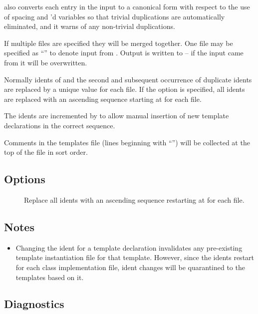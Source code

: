  also converts each entry in the input to a canonical form with
respect to the use of spacing and 'd variables so that trivial
duplications are automatically eliminated, and it warns of any non-trivial
duplications.

If multiple files are specified they will be merged together.  One file may
be specified as ``\file{-}'' to denote input from .  Output is
written to  -- if the input came from  it will
be overwritten.

Normally idents of  and the second and subsequent occurrence of
duplicate idents are replaced by a unique value for each  file.  If
the  option is specified, all idents are replaced with an ascending
sequence starting at  for each  file.

The idents are incremented by  to allow manual insertion of new
template declarations in the correct sequence.

Comments in the templates file (lines beginning with ``\code{\#}'') will be
collected at the top of the file in sort order.

\subsection*{Options}

\begin{description}
\item[]
   Replace all idents with an ascending sequence restarting at  for
   each  file.
\end{description}

\subsection*{Notes}

\begin{itemize}
\item
    Changing the ident for a template declaration invalidates any pre-existing
    template instantiation  file for that template.  However, since
    the idents restart for each class implementation  file, ident
    changes will be quarantined to the templates based on it.
\end{itemize}

\subsection*{Diagnostics}

